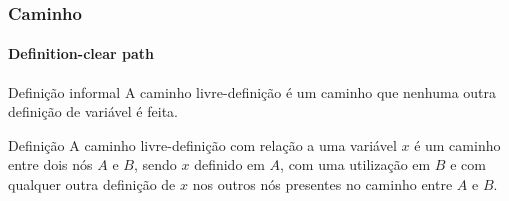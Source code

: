 \begin{frame}
\frametitle{Caminho}
\framesubtitle{Definition-clear path}
\label{concept:definition-clear-path}

\begin{block:concept}{Definição informal}
A caminho livre-definição é um caminho que nenhuma outra definição de variável é feita.
\end{block:concept}

\begin{block:concept}{Definição}
A caminho livre-definição com relação a uma variável $x$ é um caminho entre dois 
nós $A$ e $B$, sendo $x$ definido em $A$, com uma utilização em $B$ e com qualquer
outra definição de $x$ nos outros nós presentes no caminho entre $A$ e
$B$.
\end{block:concept}

\hfill
{}
\end{frame}